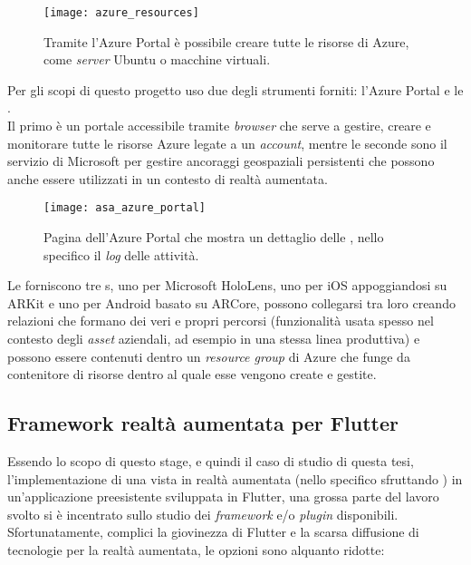\begin{figure}[H]
  \centering
  \texttt{[image: azure\_resources]}
  \caption[Azure Portal creazione risorse]{Tramite l'Azure Portal è possibile creare tutte le risorse di Azure, come \textit{server} Ubuntu o macchine virtuali.}
\end{figure}

Per gli scopi di questo progetto uso due degli strumenti forniti: l'Azure Portal e le \asa{}.\\
Il primo è un portale accessibile tramite \textit{browser} che serve a gestire, creare e monitorare tutte le risorse Azure legate a un \textit{account}, mentre le seconde sono il servizio di Microsoft per gestire ancoraggi geospaziali persistenti che possono anche essere utilizzati in un contesto di realtà aumentata.

\begin{figure}[H]
  \centering
  \texttt{[image: asa\_azure\_portal]}
  \caption[Azure Portal \asa{}]{Pagina dell'Azure Portal che mostra un dettaglio delle \asa{}, nello specifico il \textit{log} delle attività.}
\end{figure}

Le \asa{} forniscono tre \sdk{}s, uno per Microsoft HoloLens, uno per iOS appoggiandosi su ARKit e uno per Android basato su ARCore, possono collegarsi tra loro creando relazioni che formano dei veri e propri percorsi (funzionalità usata spesso nel contesto degli \textit{asset} aziendali, ad esempio in una stessa linea produttiva) e possono essere contenuti dentro un \textit{resource group} di Azure che funge da contenitore di risorse dentro al quale esse vengono create e gestite.

\subsection{Framework realtà aumentata per Flutter}
\label{subsec:framework_ar}
Essendo lo scopo di questo stage, e quindi il caso di studio di questa tesi, l'implementazione di una vista in realtà aumentata (nello specifico sfruttando \asa{}) in un'applicazione preesistente sviluppata in Flutter, una grossa parte del lavoro svolto si è incentrato sullo studio dei \textit{framework} e/o \textit{plugin} disponibili.\\
Sfortunatamente, complici la giovinezza di Flutter e la scarsa diffusione di tecnologie per la realtà aumentata, le opzioni sono alquanto ridotte:

